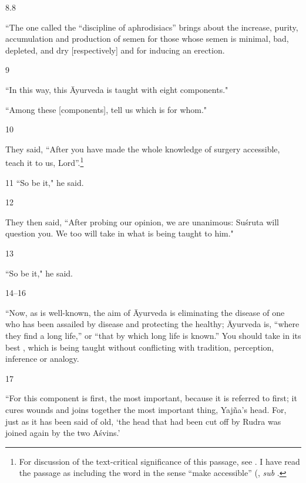 \begin{translation}
    
    \item[8.8] 
    
“The one called the “discipline of aphrodisiacs”
brings about the increase, purity, accumulation and  production
of semen for those whose semen is minimal, bad, depleted, and dry
[respectively] and for inducing an erection.
    
    \item[9] 
    
“In this way, this Āyurveda is taught with eight components."
    
“Among these [components], tell us which is for whom."
    
    \item[10] 
    
They said,  “After you have made the
whole knowledge of surgery accessible, teach it to us,
Lord”.\footnote{For discussion of the text-critical significance of
    this passage, see \cite{hari-2013}. I have read the passage as
    including the word  in the sense “make accessible”
    (\cite[cf.][94]{moni-sans}, \emph{sub} .}
    
    \item[11]  “So be it," he said.
    
    \item[12] 
    
They then said,  “After probing our opinion, we are unanimous: Suśruta
will question you. We too will take in what is being taught to him."
    
 \item[13] 
 
“So be it," he said.
    
    \item[14--16] 

“Now, as is well-known, the aim of Āyurveda is eliminating the
disease of one who has been assailed by disease and protecting the
healthy; Āyurveda is, “where they find a long life,” or “that by
which long life is known.” You should take in its best
, which is being taught without conflicting with
tradition, perception, inference or analogy.
    
    \item[17] 
    
“For this component is first, the most important, because it is 
    referred to first; it cures wounds and joins together the most important thing, 
    Yajña's head. For, just as it has been said of old, `the head that had been cut 
    off by Rudra was joined again by the two Aśvins.'
    

\end{translation}
